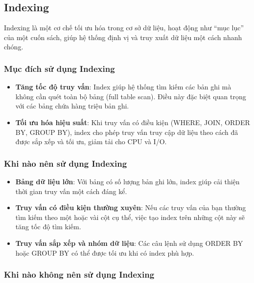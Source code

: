 \subsection{Indexing}

Indexing là một cơ chế tối ưu hóa trong cơ sở dữ liệu, hoạt động như “mục lục” của một cuốn sách, giúp hệ thống định vị và truy xuất dữ liệu một cách nhanh chóng.

\subsubsection{Mục đích sử dụng Indexing}

\begin{itemize}
    \item \textbf{Tăng tốc độ truy vấn}: Index giúp hệ thống tìm kiếm các bản ghi mà không cần quét toàn bộ bảng (full table scan). Điều này đặc biệt quan trọng với các bảng chứa hàng triệu bản ghi.
    \item \textbf{Tối ưu hóa hiệu suất}: Khi truy vấn có điều kiện (WHERE, JOIN, ORDER BY, GROUP BY), index cho phép truy vấn truy cập dữ liệu theo cách đã được sắp xếp và tối ưu, giảm tải cho CPU và I/O.
\end{itemize}

\subsubsection{Khi nào nên sử dụng Indexing}

\begin{itemize}
    \item \textbf{Bảng dữ liệu lớn}: Với bảng có số lượng bản ghi lớn, index giúp cải thiện thời gian truy vấn một cách đáng kể.
    \item \textbf{Truy vấn có điều kiện thường xuyên}: Nếu các truy vấn của bạn thường tìm kiếm theo một hoặc vài cột cụ thể, việc tạo index trên những cột này sẽ tăng tốc độ tìm kiếm.
    \item \textbf{Truy vấn sắp xếp và nhóm dữ liệu}: Các câu lệnh sử dụng ORDER BY hoặc GROUP BY có thể được tối ưu khi có index phù hợp.
\end{itemize}

\subsubsection{Khi nào không nên sử dụng Indexing}

